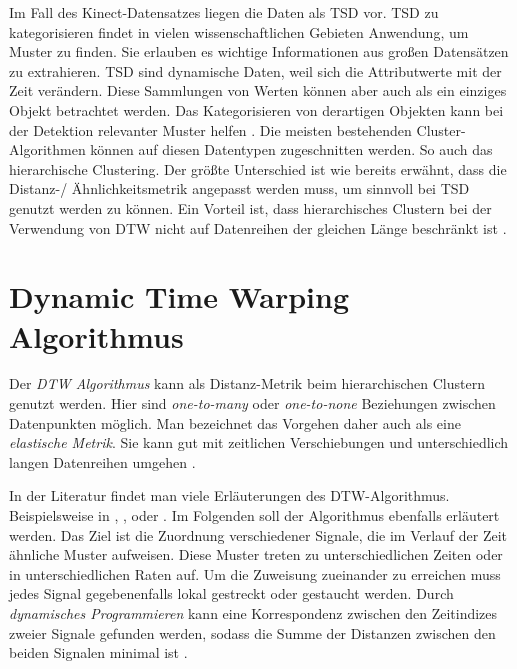 Im Fall des Kinect-Datensatzes liegen die Daten als \ac{TSD} vor.
\ac{TSD} zu kategorisieren findet in vielen wissenschaftlichen Gebieten Anwendung, um Muster zu finden.
Sie erlauben es wichtige Informationen aus großen Datensätzen zu extrahieren.
\ac{TSD} sind dynamische Daten, weil sich die Attributwerte mit der Zeit verändern.
Diese Sammlungen von Werten können aber auch als ein einziges Objekt betrachtet werden.
Das Kategorisieren von derartigen Objekten kann bei der Detektion relevanter Muster helfen \citep{aghabozorgi_time-series_2015}.
Die meisten bestehenden Cluster-Algorithmen können auf diesen Datentypen zugeschnitten werden.
So auch das hierarchische Clustering.
Der größte Unterschied ist wie bereits erwähnt, dass die Distanz-/ Ähnlichkeitsmetrik angepasst werden muss,
um sinnvoll bei \ac{TSD} genutzt werden zu können.
Ein Vorteil ist, dass hierarchisches Clustern bei der Verwendung von \ac{DTW}
nicht auf Datenreihen der gleichen Länge beschränkt ist \citep{warren_liao_clustering_2005}.


\section{Dynamic Time Warping Algorithmus}
\label{3-DTW}
Der \emph{\ac{DTW} Algorithmus} kann als Distanz-Metrik beim hierarchischen Clustern genutzt werden.
Hier sind \emph{one-to-many} oder \emph{one-to-none} Beziehungen zwischen Datenpunkten möglich.
Man bezeichnet das Vorgehen daher auch als eine \emph{elastische Metrik}.
Sie kann gut mit zeitlichen Verschiebungen und unterschiedlich langen Datenreihen umgehen \citep{aghabozorgi_time-series_2015}.

In der Literatur findet man viele Erläuterungen des \ac{DTW}-Algorithmus.
Beispielsweise in \citet{mohammadzade_dynamic_2021}, \citet{warren_liao_clustering_2005},
\citet{aghabozorgi_time-series_2015} oder \citet{yu_dynamic_2019}.
Im Folgenden soll der Algorithmus ebenfalls erläutert werden.
Das Ziel ist die Zuordnung verschiedener Signale,
die im Verlauf der Zeit ähnliche Muster aufweisen.
Diese Muster treten zu unterschiedlichen Zeiten oder in unterschiedlichen Raten auf.
Um die Zuweisung zueinander zu erreichen muss jedes Signal gegebenenfalls lokal gestreckt oder gestaucht werden.
Durch \emph{dynamisches Programmieren} kann eine Korrespondenz zwischen den Zeitindizes zweier Signale gefunden werden,
sodass die Summe der Distanzen zwischen den beiden Signalen minimal ist \citep{mohammadzade_dynamic_2021}.

